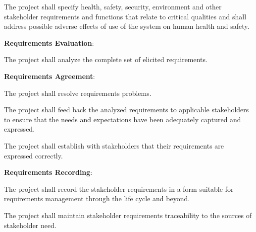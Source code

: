 \begin{adjustwidth}{2em}{0pt}
\begin{compactenum}
\begin{compactenum}
\begin{compactenum}
						\end{compactenum}

						\item The project shall specify health, safety, security, environment and other stakeholder requirements and functions that relate to critical qualities and shall address possible adverse effects of use of the system on human health and safety.

					\end{compactenum}

					\item {\bf Requirements Evaluation}:
					\begin{compactenum}

						\item The project shall analyze the complete set of elicited requirements.

					\end{compactenum}

					\item {\bf Requirements Agreement}:
					\begin{compactenum}

						\item The project shall resolve requirements problems.

						\item The project shall feed back the analyzed requirements to applicable stakeholders to ensure that the needs and expectations have been adequately captured and expressed.

						\item The project shall establish with stakeholders that their requirements are expressed correctly.

					\end{compactenum}

					\item {\bf Requirements Recording}:

					\begin{compactenum}

						\item The project shall record the stakeholder requirements in a form suitable for requirements management through the life cycle and beyond.

						\item The project shall maintain stakeholder requirements traceability to the sources of stakeholder need.

					\end{compactenum}

				\end{compactenum}

			\end{adjustwidth}

